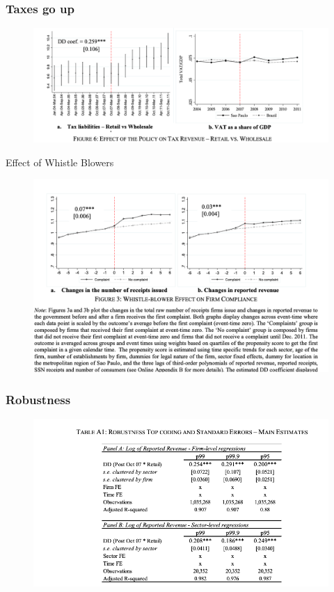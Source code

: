 \documentclass{beamer}
\begin{document}
\begin{frame}
\frametitle{Taxes go up}
\begin{figure}
    \centering
    \includegraphics[width=\textwidth]{Paper Presentations/Consumers as Tax Auditors/TEPOLICY.png}
\end{figure}
\end{frame}

\begin{frame}{Effect of Whistle Blowers}
\begin{figure}
    \centering
    \includegraphics[width=\textwidth]{Paper Presentations/Consumers as Tax Auditors/Whistle Blower.png}
    \label{fig:enter-label}
\end{figure}
\end{frame}

\begin{frame}
\frametitle{Robustness}
\begin{figure}
    \centering
    \includegraphics[width=\textwidth]{Paper Presentations/Consumers as Tax Auditors/R1.png}
\end{figure}
\end{frame}
\end{document}

